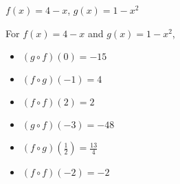 {$f(x) = 4-x$, $g(x) = 1-x^2$}
{For   $f(x) = 4-x$ and $g(x) = 1-x^2$,
\begin{multicols}{2}

\begin{itemize}

\item  $(g\circ f)(0) = -15$

\item  $(f\circ g)(-1) = 4$

\item  $(f \circ f)(2) = 2$

\item  $(g\circ f)(-3) = -48$

\item  $(f\circ g)\left(\frac{1}{2}\right) = \frac{13}{4}$

\item  $(f \circ f)(-2) = -2$

\end{itemize}

\end{multicols}}